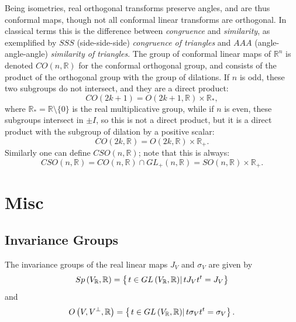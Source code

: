 \documentclass[aps,preprint]{revtex4}
\begin{document}
Being isometries, real orthogonal transforms preserve angles, and are thus
conformal maps, though not all conformal linear transforms are orthogonal.
In classical terms this is the difference between \emph{congruence} and 
\emph{similarity}, as exemplified by $SSS$ (side-side-side) \emph{congruence
of triangles} and $AAA$ (angle-angle-angle) \emph{similarity of triangles}.
The group of conformal linear maps of $\mathbb{R}^{n}$ is denoted $CO(n,%
\mathbb{R})$ for the conformal orthogonal group, and consists of the product
of the orthogonal group with the group of dilations. If $n$ is odd, these
two subgroups do not intersect, and they are a direct product: 
\begin{equation}
CO(2k+1)=O(2k+1,\mathbb{R})\times \mathbb{R}_{\ast },
\end{equation}%
where $\mathbb{R}_{\ast }=\mathbb{R}\setminus \{0\}$ is the real
multiplicative group, while if $n$ is even, these subgroups intersect in $%
\pm I$, so this is not a direct product, but it is a direct product with the
subgroup of dilation by a positive scalar: 
\begin{equation}
CO(2k,\mathbb{R})=O(2k,\mathbb{R})\times \mathbb{R}_{+}.
\end{equation}%
Similarly one can define $CSO(n,\mathbb{R})$; note that this is always: 
\begin{equation}
CSO(n,\mathbb{R})=CO(n,\mathbb{R})\cap GL_{+}(n,\mathbb{R})=SO(n,\mathbb{R}%
)\times \mathbb{R}_{+}.
\end{equation}

\bigskip

\section{Misc}

\subsection{Invariance Groups}

The invariance groups of the real linear maps $J_{V}$ and $\sigma _{V}$ are
given by 
\begin{equation}
Sp\left( V_{\mathbb{R}},\mathbb{R}\right) =\left\{ \left. t\in GL\left( V_{%
\mathbb{R}},\mathbb{R}\right) \right\vert tJ_{V}t^{t}=J_{V}\right\}
\end{equation}%
and 
\begin{equation}
O\left( V,V^{\bot },\mathbb{R}\right) =\left\{ \left. t\in GL\left( V_{%
\mathbb{R}},\mathbb{R}\right) \right\vert t\sigma _{V}t^{t}=\sigma
_{V}\right\} .
\end{equation}
\end{document}
